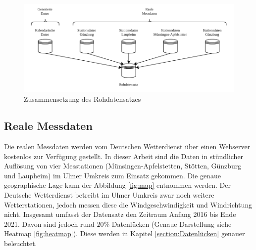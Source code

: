 \documentclass[
12pt, %
toc=listofnumbered, %
toc=chapterentrydotfill, %
numbers=noenddot, %
captions=tableheading, %
bibliography=numbered
]{scrreprt}
\let\Oldsubsection\subsection
\renewcommand{\subsection}{\FloatBarrier\Oldsubsection}
\begin{document}
\begin{figure}[tph]
	\begin{center}
		\includegraphics[]{./images/rohdatensatz.pdf}
		\caption{Zusammensetzung des Rohdatensatzes}
		\label{fig:rohdatensatz}
	\end{center}
\end{figure}

\subsection{Reale Messdaten}\label{section:realeMessdaten}
Die realen Messdaten werden vom Deutschen Wetterdienst über einen Webserver kostenlos zur Verfügung gestellt. In dieser Arbeit sind die Daten in stündlicher Auflösung von vier Messtationen (Münsingen-Apfelstetten, Stötten, Günzburg und Laupheim) im Ulmer Umkreis zum Einsatz gekommen. Die genaue geographische Lage kann der Abbildung \ref{fig:map} entnommen werden. Der Deutsche Wetterdienst betreibt im Ulmer Umkreis zwar noch weitere Wetterstationen, jedoch messen diese die Windgeschwindigkeit und Windrichtung nicht. Insgesamt umfasst der Datensatz den Zeitraum Anfang 2016 bis Ende 2021. Davon sind jedoch rund $20\%$ Datenlücken (Genaue Darstellung siehe Heatmap \ref{fig:heatmap}). Diese werden in Kapitel \ref{section:Datenlücken} genauer beleuchtet. 
\end{document}
